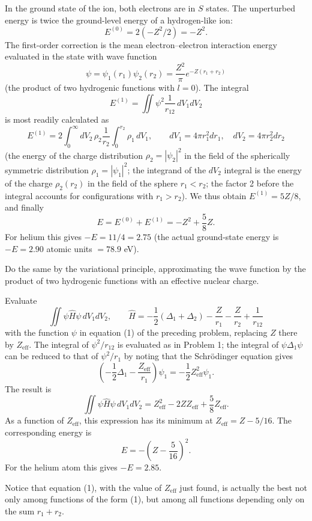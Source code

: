 \SolutionHeading In the ground state of the ion, both electrons are in $S$ states. The unperturbed energy is twice the ground-level energy of a hydrogen-like ion:
\[
 E^{(0)}=2(-Z^2/2)=-Z^2.
\]
The first-order correction is the mean electron--electron interaction energy evaluated in the state with wave function
\begin{equation}
 \psi=\psi_1(r_1)\psi_2(r_2)=\frac{Z^2}{\pi}e^{-Z(r_1+r_2)}
 \tag{1}
\end{equation}
(the product of two hydrogenic functions with $l=0$). The integral
\[
 E^{(1)}=\iint\psi^2\frac1{r_{12}}\,dV_1dV_2
\]
is most readily calculated as
\[
 E^{(1)}=2\int_0^\infty dV_2\,\rho_2\frac1{r_2}\int_0^{r_2}\rho_1\,dV_1,\qquad dV_1=4\pi r_1^2dr_1,\quad dV_2=4\pi r_2^2dr_2
\]
(the energy of the charge distribution $\rho_2=|\psi_2|^2$ in the field of the spherically symmetric distribution $\rho_1=|\psi_1|^2$; the integrand of the $dV_2$ integral is the energy of the charge $\rho_2(r_2)$ in the field of the sphere $r_1<r_2$; the factor 2 before the integral accounts for configurations with $r_1>r_2$). We thus obtain $E^{(1)}=5Z/8$, and finally
\[
 E=E^{(0)}+E^{(1)}=-Z^2+\frac58Z.
\]
For helium this gives $-E=11/4=2.75$ (the actual ground-state energy is $-E=2.90$ atomic units $=78.9$ eV).

 Do the same by the variational principle, approximating the wave function by the product of two hydrogenic functions with an effective nuclear charge.

\SolutionHeading Evaluate
\[
 \iint\psi\hat H\psi\,dV_1dV_2,\qquad \hat H=-\frac12(\Delta_1+\Delta_2)-\frac Z{r_1}-\frac Z{r_2}+\frac1{r_{12}}
\]
with the function $\psi$ in equation (1) of the preceding problem, replacing $Z$ there by $Z_{\mathrm{eff}}$. The integral of $\psi^2/r_{12}$ is evaluated as in Problem 1; the integral of $\psi\Delta_1\psi$ can be reduced to that of $\psi^2/r_1$ by noting that the Schrödinger equation gives
\[
 \left(-\frac12\Delta_1-\frac{Z_{\mathrm{eff}}}{r_1}\right)\psi_1=-\frac12Z_{\mathrm{eff}}^2\psi_1.
\]
The result is
\[
 \iint\psi\hat H\psi\,dV_1dV_2=Z_{\mathrm{eff}}^2-2ZZ_{\mathrm{eff}}+\frac58Z_{\mathrm{eff}}.
\]
As a function of $Z_{\mathrm{eff}}$, this expression has its minimum at $Z_{\mathrm{eff}}=Z-5/16$. The corresponding energy is
\[
 E=-\left(Z-\frac5{16}\right)^2.
\]
For the helium atom this gives $-E=2.85$.

Notice that equation (1), with the value of $Z_{\mathrm{eff}}$ just found, is actually the best not only among functions of the form (1), but among all functions depending only on the sum $r_1+r_2$.
